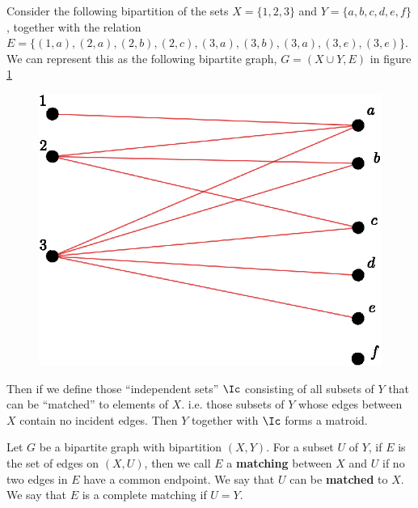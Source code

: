 \begin{example}\label{}
    Consider the following bipartition of the sets $X=\{1,2,3\}$ and
    $Y=\{a,b,c,d,e,f\}$, together with the relation $E=\{(1,a), (2,a), (2,b),
        (2,c), (3,a), (3,b), (3,a), (3,e), (3,e)\}$. We can represent this as
        the following bipartite graph, $G=(X \cup Y, E)$ in figure \ref{fig_1.3}
    \begin{figure}[h]
        \centering
        \includegraphics[scale=0.5]{Figures/Chapter1/matching.eps}
        \caption{}
        \label{fig_1.3}
    \end{figure}
    Then if we define those ``independent sets'' $\Ic$ consisting of all subsets
    of  $Y$ that can be ``matched'' to elements of $X$. i.e. those subsets of
    $Y$ whose edges between $X$ contain no incident edges. Then $Y$ together with
    $\Ic$ forms a matroid.
\end{example}

\begin{definition}
    Let $G$ be a bipartite graph with bipartition $(X,Y)$. For a subset $U$  of
    $Y$, if  $E$ is the set of edges on $ (X,U)$, then we call $E$ a
    \textbf{matching} between $X$ and  $U$ if no two edges in  $E$ have a common
    endpoint. We say that $U$ can be \textbf{matched} to $X$. We say that  $E$
    is a complete matching if $U=Y$.
\end{definition}

